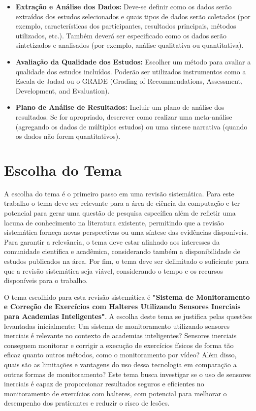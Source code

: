 \documentclass[a4paper,12pt]{article}
\begin{document}
\begin{itemize}
    \item \textbf{Extração e Análise dos Dados:} Deve-se definir como os dados serão extraídos dos estudos selecionados e quais tipos de dados serão coletados (por exemplo, características dos participantes, resultados principais, métodos utilizados, etc.). Também deverá ser especificado como os dados serão sintetizados e analisados (por exemplo, análise qualitativa ou quantitativa).
    
    \item \textbf{Avaliação da Qualidade dos Estudos:} Escolher um método para avaliar a qualidade dos estudos incluídos. Poderão ser utilizados instrumentos como a Escala de Jadad ou o GRADE (Grading of Recommendations, Assessment, Development, and Evaluation).
    
    \item \textbf{Plano de Análise de Resultados:} Incluir um plano de análise dos resultados. Se for apropriado, descrever como realizar uma meta-análise (agregando os dados de múltiplos estudos) ou uma síntese narrativa (quando os dados não forem quantitativos).
\end{itemize}

\section{Escolha do Tema}

A escolha do tema é o primeiro passo em uma revisão sistemática. Para este trabalho o tema deve ser relevante para a área de ciência da computação e ter potencial para gerar uma questão de pesquisa específica além de refletir uma lacuna de conhecimento na literatura existente, permitindo que a revisão sistemática forneça novas perspectivas ou uma síntese das evidências disponíveis. Para garantir a relevância, o tema deve estar alinhado aos interesses da comunidade científica e acadêmica, considerando também a disponibilidade de estudos publicados na área. Por fim, o tema deve ser delimitado o suficiente para que a revisão sistemática seja viável, considerando o tempo e os recursos disponíveis para o trabalho.

O tema escolhido para esta revisão sistemática é \textbf{"Sistema de Monitoramento e Correção de Exercícios com Halteres Utilizando Sensores Inerciais para Academias Inteligentes"}. A escolha deste tema se justifica pelas questões levantadas inicialmente: Um sistema de monitoramento utilizando sensores inerciais é relevante no contexto de academias inteligentes? Sensores inerciais conseguem monitorar e corrigir a execução de exercícios físicos de forma tão eficaz quanto outros métodos, como o monitoramento por vídeo? Além disso, quais são as limitações e vantagens do uso dessa tecnologia em comparação a outras formas de monitoramento? Este tema busca investigar se o uso de sensores inerciais é capaz de proporcionar resultados seguros e eficientes no monitoramento de exercícios com halteres, com potencial para melhorar o desempenho dos praticantes e reduzir o risco de lesões.
\end{document}
